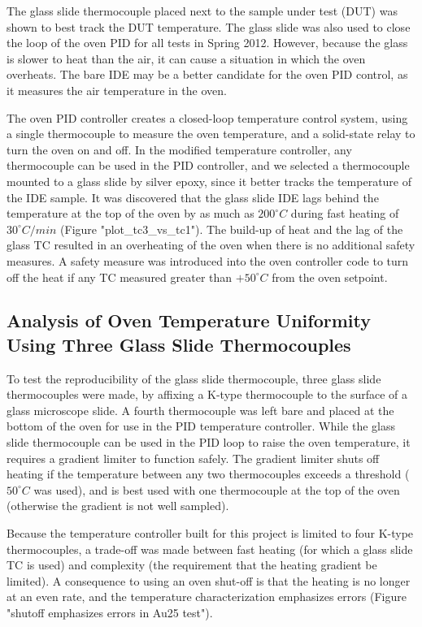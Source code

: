 \documentclass[12pt,oneside,english]{article}
\begin{document}
	The glass slide thermocouple placed next to the sample under test (DUT) was shown to best track the DUT temperature.  The glass slide was also used to close the loop of the oven PID for all tests in Spring 2012.  However, because the glass is slower to heat than the air, it can cause a situation in which the oven overheats.  The bare IDE may be a better candidate for the oven PID control, as it measures the air temperature in the oven.  
	
	The oven PID controller creates a closed-loop temperature control system, using a single thermocouple to measure the oven temperature, and a solid-state relay to turn the oven on and off. 
	In the modified temperature controller, any thermocouple can be used in the PID controller, and we selected a thermocouple mounted to a glass slide by silver epoxy, since it better tracks the temperature of the IDE sample.
	It was discovered that the glass slide IDE lags behind the temperature at the top of the oven by as much as $200^{\circ}C$ during fast heating of $30^{\circ}C/min$ (Figure "plot\_tc3\_vs\_tc1").  The build-up of heat and the lag of the glass TC resulted in an overheating of the oven when there is no additional safety measures.  A safety measure was introduced into the oven controller code to turn off the heat if any TC measured greater than $+50^{\circ}C$ from the oven setpoint.
	
	
	
\subsection{Analysis of Oven Temperature Uniformity Using Three Glass Slide Thermocouples}
To test the reproducibility of the glass slide thermocouple, three glass slide thermocouples were made, by affixing a K-type thermocouple to the surface of a glass microscope slide.
A fourth thermocouple was left bare and placed at the bottom of the oven for use in the PID temperature controller.
While the glass slide thermocouple can be used in the PID loop to raise the oven temperature, it requires a gradient limiter to function safely.  
The gradient limiter shuts off heating if the temperature between any two thermocouples exceeds a threshold ($50^{\circ}C$ was used), and is best used with one thermocouple at the top of the oven (otherwise the gradient is not well sampled).

Because the temperature controller built for this project is limited to four K-type thermocouples, a trade-off was made between fast heating (for which a glass slide TC is used) and complexity (the requirement that the heating gradient be limited). 
A consequence to using an oven shut-off is that the heating is no longer at an even rate, and the temperature characterization emphasizes errors (Figure "shutoff emphasizes errors in Au25 test").
\end{document}
